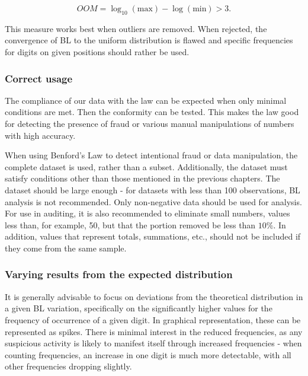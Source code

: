 \begin{equation}
    OOM = \log_{10}(\text{max}) - \log(\text{min}) > 3. 
    \label{OOM}
\end{equation}

This measure works best when outliers are removed. When rejected, the convergence of BL to the uniform distribution is flawed and specific frequencies for digits on given positions should rather be used. \cite{kossovsky2014benford}
 
\subsubsection*{Correct usage} 

The compliance of our data with the law can be expected when only minimal conditions are met. Then the conformity can be tested. This makes the law good for detecting the presence of fraud or various manual manipulations of numbers with high accuracy. \cite{kossovsky2014benford, Cerqueti2202,kossovsky2014benford} 

When using Benford's Law to detect intentional fraud or data manipulation, the complete dataset is used, rather than a subset. Additionally, the dataset must satisfy conditions other than those mentioned in the previous chapters. The dataset should be large enough - for datasets with less than 100 observations, BL analysis is not recommended. %
Only non-negative data should be used for analysis. For use in auditing, it is also recommended to eliminate small numbers, values less than, for example, 50, but that the portion removed be less than $10\%$. In addition, values that represent totals, summations, etc., should not be included if they come from the same sample. \cite{kossovsky2014benford} %

\subsubsection*{Varying results from the expected distribution}

It is generally advisable to focus on deviations from the theoretical distribution in a given BL variation, specifically on the significantly higher values for the frequency of occurrence of a given digit. In graphical representation, these can be represented as spikes. There is minimal interest in the reduced frequencies, as any suspicious activity is likely to manifest itself through increased frequencies - when counting frequencies, an increase in one digit is much more detectable, with all other frequencies dropping slightly. \cite{kossovsky2014benford} %

